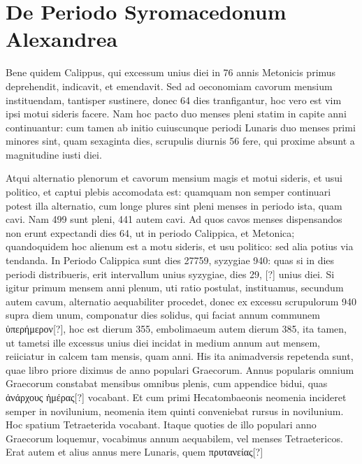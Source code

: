 \section{De Periodo Syromacedonum Alexandrea}
Bene quidem Calippus, qui excessum unius diei in 76 annis Metonicis
primus deprehendit, indicavit, et emendavit.
Sed ad oeconomiam
cavorum mensium instituendam, tantisper sustinere, donec 64
dies tranfigantur, hoc vero est vim ipsi motui sideris facere.
Nam hoc
pacto duo menses pleni statim in capite anni continuantur: cum tamen
ab initio cuiuscunque periodi Lunaris duo menses primi minores sint,
quam sexaginta dies, scrupulis diurnis 56 fere, qui proxime absunt a
magnitudine iusti diei.

Atqui alternatio plenorum et cavorum mensium
magis et motui sideris, et usui politico, et captui plebis accomodata
est: quamquam non semper continuari potest illa alternatio, cum
longe plures sint pleni menses in periodo ista, quam cavi.
Nam 499 sunt
pleni, 441 autem cavi.
Ad quos cavos menses dispensandos non erunt
expectandi dies 64, ut in periodo Calippica, et Metonica; quandoquidem
hoc alienum est a motu sideris, et usu politico: sed alia potius
via tendanda.
In Periodo Calippica sunt dies 27759, syzygiae 940:
quas si in dies periodi distribueris, erit intervallum unius syzygiae, dies
29, [?] unius diei.
Si igitur primum mensem anni plenum, uti ratio
postulat, instituamus, secundum autem cavum, alternatio aequabiliter
procedet, donec ex excessu scrupulorum 940 supra diem unum,
componatur dies solidus, qui faciat annum communem
 \textgreek{ὑπερήμερον[?]},
hoc est dierum 355, embolimaeum autem dierum 385, ita tamen, ut
tametsi ille excessus unius diei incidat in medium annum aut mensem,
reiiciatur in calcem tam mensis, quam anni.
 His ita animadversis
repetenda sunt, quae libro priore diximus de anno populari Graecorum.
Annus popularis omnium Graecorum constabat mensibus omnibus
plenis, cum appendice bidui, quas
 \textgreek{ἀνάρχους ἡμέρας[?]} vocabant.
Et cum
primi Hecatombaeonis neomenia incideret semper in novilunium,
neomenia item quinti conveniebat rursus in novilunium.
Hoc spatium Tetraeterida vocabant.
Itaque quoties de illo populari anno
Graecorum loquemur, vocabimus annum aequabilem, vel menses
Tetraetericos.
Erat autem et alius annus mere Lunaris, quem
 \textgreek{πρυτανείας[?]}
